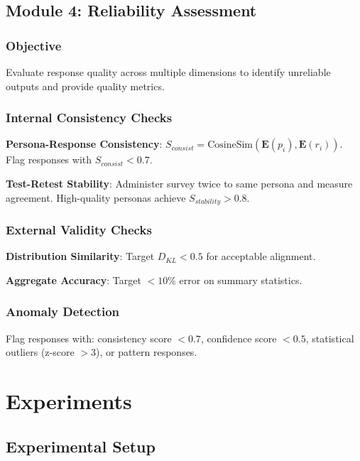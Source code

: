 \documentclass[sigconf,nonarchival]{acmart}
\begin{document}
\subsection{Module 4: Reliability Assessment}

\subsubsection{Objective}

Evaluate response quality across multiple dimensions to identify unreliable outputs and provide quality metrics.

\subsubsection{Internal Consistency Checks}

\textbf{Persona-Response Consistency}: $S_{consist} = \text{CosineSim}(\mathbf{E}(p_i), \mathbf{E}(r_i))$. Flag responses with $S_{consist} < 0.7$.

\textbf{Test-Retest Stability}: Administer survey twice to same persona and measure agreement. High-quality personas achieve $S_{stability} > 0.8$.

\subsubsection{External Validity Checks}

\textbf{Distribution Similarity}: Target $D_{KL} < 0.5$ for acceptable alignment.

\textbf{Aggregate Accuracy}: Target $< 10\%$ error on summary statistics.

\subsubsection{Anomaly Detection}

Flag responses with: consistency score $< 0.7$, confidence score $< 0.5$, statistical outliers (z-score $> 3$), or pattern responses.


\section{Experiments}

\subsection{Experimental Setup}
\end{document}

